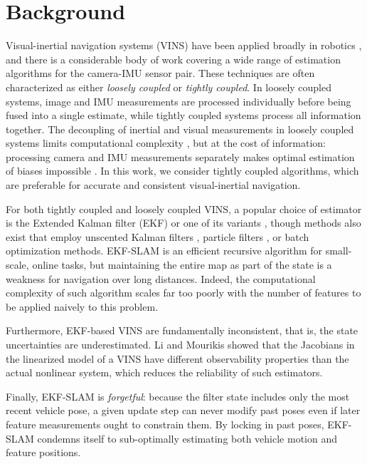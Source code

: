 \documentclass[letterpaper, 10 pt, conference]{ieeeconf}  %
\begin{document}
\section{Background} \label{sec:relatedwork}

Visual-inertial navigation systems (VINS) have been applied broadly in robotics \cite{Mourikis:2007:ICRA, Sibley:2010:JFR, Huster:2002:OC, Kottas:2013:IROS, Kim:2007:RSS, Li:2013coa,  You:2001:VR}, and there is a considerable body of work covering a wide range of estimation algorithms for the camera-IMU sensor pair. 
These techniques are often characterized as either \textit{loosely coupled} or \textit{tightly coupled}.
In loosely coupled systems, image and IMU measurements are processed individually before being fused into a single estimate, while tightly coupled systems process all information together.  
The decoupling of inertial and visual measurements in loosely coupled systems limits computational complexity \cite{Leutenegger:2015:IJRR}, but at the cost of information: processing camera and IMU measurements separately makes optimal estimation of biases impossible \cite{Li:2013coa}. 
In this work, we consider tightly coupled algorithms, which are preferable for accurate and consistent visual-inertial navigation. 

For both tightly coupled and loosely coupled VINS, a popular choice of estimator is the Extended Kalman filter (EKF) or one of its variants \cite{Huster:2002:OC, You:2001:VR, Kottas:2013:RSS, Kim:2007:RSS, Mourikis:2007:ICRA}, though methods also exist that employ unscented Kalman filters \cite{Ebcin:2007:ION}, particle filters \cite{Fox:1999:JAIR, Pupilli:2005:BMVC}, or batch optimization methods\cite{Triggs:2000va,Strelow:2004:IJR}. 
EKF-SLAM is an efficient recursive algorithm for small-scale, online tasks, but maintaining the entire map as part of the state is a weakness for navigation over long distances.
Indeed, the computational complexity of such algorithm scales far too poorly with the number of features to be applied naively to this problem.

Furthermore, EKF-based VINS are fundamentally inconsistent, that is, the state uncertainties are underestimated.
Li and Mourikis \cite{Li:2013coa} showed that the Jacobians in the linearized model of a VINS have different observability properties than the actual nonlinear system, which reduces the reliability of such estimators.

Finally, EKF-SLAM is \textit{forgetful}:
because the filter state includes only the most recent vehicle pose, a given update step can never modify past poses even if later feature measurements ought to constrain them.
By locking in past poses, EKF-SLAM condemns itself to sub-optimally estimating both vehicle motion and feature positions.
\end{document}
